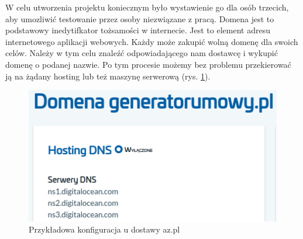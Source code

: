 W celu utworzenia projektu koniecznym było wystawienie go dla osób trzecich, aby umozliwić testowanie przez osoby niezwiązane z pracą.
Domena jest to podstawowy inedytifkator tożsamości w internecie. Jest to element adresu internetowego aplikacji webowych.
Każdy może zakupić wolną domenę dla swoich celów. Należy w tym celu znaleźć odpowiadającego nam dostawcę i wykupić domenę o podanej nazwie.
Po tym procesie możemy bez problemu przekierować ją na żądany hosting lub też maszynę serwerową (rys. \ref{fig:domain}).

\begin{figure}[!ht]
    \centering
    \includegraphics[width=5in]{images/domain.png}
    \caption{Przykładowa konfiguracja u dostawy az.pl \label{fig:domain}}
\end{figure}